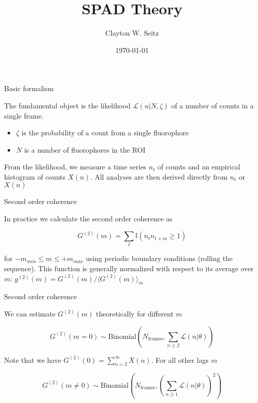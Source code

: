 \documentclass{beamer}					%
\title{SPAD Theory}	%
\author{Clayton W. Seitz}								%
\date{\today}									%
\begin{document}
\begin{frame}
  \titlepage
\end{frame}

\begin{frame}{Basic formalism}

The fundamental object is the likelihood $\mathcal{L}(n\lvert N,\zeta)$ of  a number of counts in a single frame.

\vspace{0.2in}

\begin{itemize}
\item $\zeta$ is the probability of a count from a single fluorophore
\item $N$ is a number of fluorophores in the ROI
\end{itemize}

\vspace{0.2in}
From the likelihood, we measure a time series $n_{t}$ of counts and an empirical histogram of counts $X(n)$. All analyses are then derived directly from $n_{t}$ or $X(n)$


\end{frame}

\begin{frame}{Second order coherence}

In practice we calculate the second order coherence as 

\begin{equation*}
G^{(2)}(m) = \sum_{t} \mathbb{I}(n_{t}n_{t+m}\geq 1)
\end{equation*}

for $-m_{min} \leq m \leq +m_{max}$ using periodic boundary conditions (rolling the sequence). This function is generally normalized with respect to its average over $m$: $g^{(2)}(m) = G^{(2)}(m)/\langle G^{(2)}(m)\rangle_{m}$

\end{frame}

\begin{frame}{Second order coherence}

We can estimate $G^{(2)}(m)$ theoretically for different $m$

\begin{equation*}
G^{(2)}(m=0) \sim \mathrm{Binomial}(N_{\mathrm{frames}},\sum_{n\geq 2}\mathcal{L}(n\lvert \theta))
\end{equation*}

Note that we have $G^{(2)}(0) = \sum_{n=2}^{\infty} X(n)$. For all other lags $m$

\begin{equation*}
G^{(2)}(m\neq 0) \sim \mathrm{Binomial}(N_{\mathrm{frames}},(\sum_{n\geq 1}\mathcal{L}(n\lvert \theta))^{2})
\end{equation*}

\end{frame}
\end{document}
